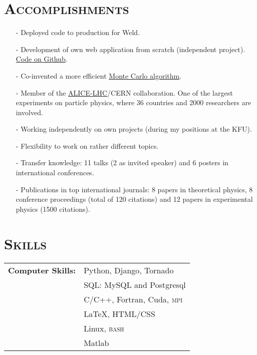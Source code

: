 \documentclass[a4paper, 10pt]{article}
\begin{document}
\section{\textsc{Accomplishments}}
\vspace*{1mm}
\begin{itemize}
    \item[-] Deployed code to production for Weld.
    \item[-] Development of own web application from scratch (independent project).  \href{https://github.com/ydelgadom/non_physics}{Code on Github}.\vspace{-1mm}
    \item[-] Co-invented a more efficient \href{http://inspirehep.net/record/1202877}{Monte Carlo algorithm}.
    \vspace{-1mm}
    \item[-] Member of the \href{http://home.web.cern.ch/about/experiments/alice}{ALICE-LHC}/CERN
    collaboration.  One of the largest experiments on particle physics, where 36 countries and 2000 researchers
    are involved.
    \vspace*{-1mm}
    \item[-] Working independently on own projects (during my positions at the KFU).
    \vspace*{-1mm}
    \item[-] Flexibility to work on rather different topics.
     \vspace*{-1mm}
    \item[-] Transfer knowledge: 11 talks (2 as invited speaker) 
    and 6 posters in international conferences.
     \vspace*{-1mm}
    \item[-] Publications in top international journals:
    8 papers in theoretical physics, 8 conference proceedings (total of 120 citations) and 
    12 papers in experimental physics (1500 citations).
\end{itemize}


\newpage
\section{\textsc{Skills}}
\vspace*{1mm}
\hspace*{-0.7cm}\begin{tabular}{ll}
{\bf Computer Skills:}
      & Python, Django, Tornado\vspace*{1mm}\\ 
      & SQL:  MySQL and Postgresql\vspace*{1mm}\\ 
      & C/C++, Fortran, Cuda, \textsc{mpi}\vspace*{1mm}\\
      & {\LaTeX}, HTML/CSS\vspace*{1mm}\\
      & Linux, \textsc{bash}\vspace*{1mm}\\
      & Matlab\\
\end{tabular}\\[0.5pt]
\end{document}
